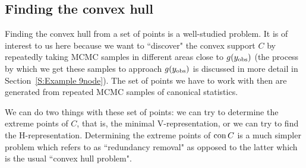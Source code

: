 \subsection{Finding the convex hull}
Finding the convex hull from a set of points is a well-studied problem.  It 
is of interest to us here because we want to ``discover" the convex support $C$
by repeatedly taking MCMC samples in different areas close to $g(y_{\text{obs}})$ (the
process by which we get these samples to approach $g(y_{\text{obs}})$ is discussed
in more detail in Section~\ref{S:Example 9node}).  The 
set of points we have to work with then are generated from repeated MCMC
samples of canonical statistics.

We can do two things with these set of points: we can try to determine the
extreme points of $C$, that is, the minimal V-representation, or we can try to find
the H-representation.  Determining the extreme points of $\operatorname{con} C$ 
is a much simpler problem which \citet{Fukuda:2004} refers to as ``redundancy 
removal" as opposed to the latter which is the usual ``convex hull problem".

